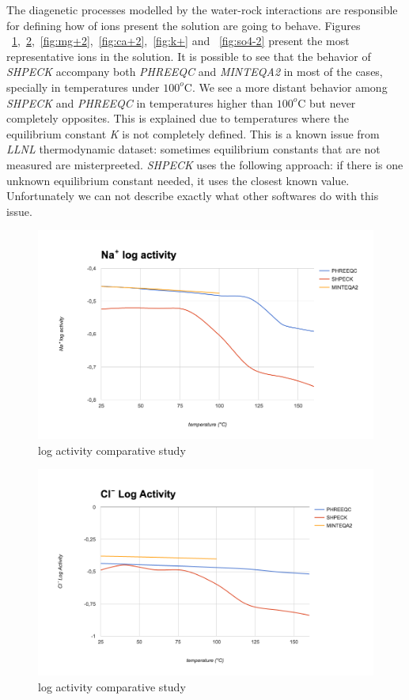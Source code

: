 The diagenetic processes modelled by the water-rock interactions are responsible for defining how of ions present the solution are going to behave. Figures ~\ref{fig:na+},~\ref{fig:cl-},~\ref{fig:mg+2},~\ref{fig:ca+2},~\ref{fig:k+} and ~\ref{fig:so4-2} present the most representative ions in the solution. It is possible to see that the behavior of \emph{SHPECK} accompany both \emph{PHREEQC} and \emph{MINTEQA2} in most of the cases, specially in temperatures under $100^o$C. We see a more distant behavior among \emph{SHPECK} and \emph{PHREEQC} in temperatures higher than $100^o$C but never completely opposites. This is explained due to temperatures where the equilibrium constant \emph{K} is not completely defined. This is a known issue from \emph{LLNL} thermodynamic dataset: sometimes equilibrium constants that are not measured are misterpreeted. \emph{SHPECK} uses the following approach: if there is one unknown equilibrium constant needed, it uses the closest known value. Unfortunately we can not describe exactly what other softwares do with this issue.

\begin{figure}[ht!]
\centering
\includegraphics[width=140mm]{figures/na+.png}
\caption{ log activity comparative study}
\label{fig:na+}
\end{figure}

\begin{figure}[ht!]
\centering
\includegraphics[width=140mm]{figures/cl-.png}
\caption{ log activity comparative study}
\label{fig:cl-}
\end{figure}

